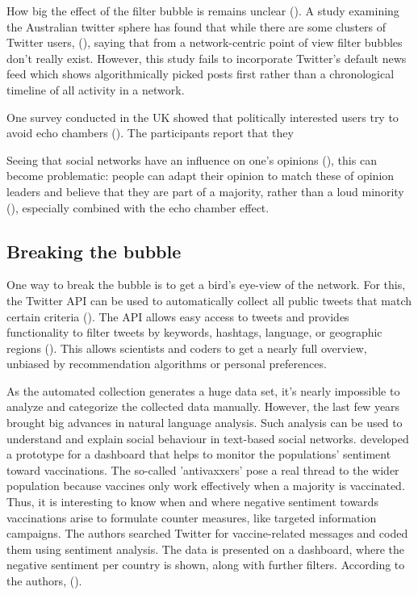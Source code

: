 How big the effect of the filter bubble is remains unclear (\cite{bruns_echo_2017}). A study examining the Australian twitter sphere has found that while there are some clusters of Twitter users,  (\cite[9]{bruns_echo_2017}), saying that from a network-centric point of view filter bubbles don't really exist. However, this study fails to incorporate Twitter's default news feed which shows algorithmically picked posts first rather than a chronological timeline of all activity in a network.

One survey conducted in the UK showed that politically interested users try to avoid echo chambers (\cite{dubois_echo_2018}). The participants report that they 


Seeing that social networks have an influence on one's opinions (\cite{altafini2012dynamics}), this can become problematic: people can adapt their opinion to match these of opinion leaders and believe that they are part of a majority, rather than a loud minority (\cite{moscovici_silent_1991}), especially combined with the echo chamber effect. 


\subsection{Breaking the bubble}
One way to break the bubble is to get a bird's eye-view of the network. For this, the Twitter API can be used to automatically collect all public tweets that match certain criteria (\cite{twitter_inc_about_nodate}). The API allows easy access to tweets and provides functionality to filter tweets by keywords, hashtags, language, or geographic regions (\cite{bello2017detecting}). This allows scientists and coders to get a nearly full overview, unbiased by recommendation algorithms or personal preferences.

As the automated collection generates a huge data set, it's nearly impossible to analyze and categorize the collected data manually. However, the last few years brought big advances in natural language analysis. Such analysis can be used to understand and explain social behaviour in text-based social networks. \citeauthor{bahk2016publicly} developed a prototype for a dashboard that helps to monitor the populations' sentiment toward vaccinations. The so-called 'antivaxxers' pose a real thread to the wider population because vaccines only work effectively when a majority is vaccinated. Thus, it is interesting to know when and where negative sentiment towards vaccinations arise to formulate counter measures, like targeted information campaigns. The authors searched Twitter for vaccine-related messages and coded them using sentiment analysis. The data is presented on a dashboard, where the negative sentiment per country is shown, along with further filters. According to the authors,  (\cite[343]{bahk2016publicly}).

